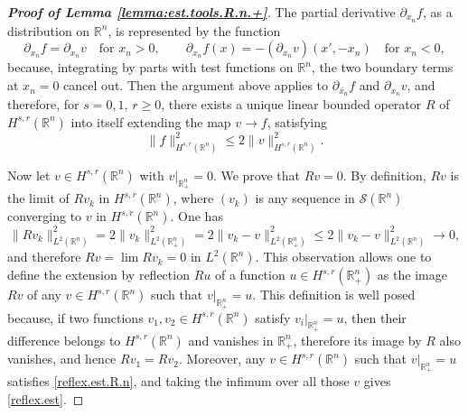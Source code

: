 \documentclass[10pt,reqno,a4paper]{article}
\numberwithin{equation}{section}
\theoremstyle{plain}
\theoremstyle{definition}
\newcommand{\R}{{\mathbb R}}
\newcommand{\mS}{\mathcal{S}}
\newcommand{\pa}{\partial}
\begin{document}
\begin{proof}[\textbf{Proof of Lemma \ref{lemma:est.tools.R.n.+}}]
The partial derivative $\pa_{x_n} f$, as a distribution on $\R^n$, is represented by the function
\[
\pa_{x_n} f = \pa_{x_n} v \quad \text{for } x_n > 0, 
\qquad 
\pa_{x_n} f(x) = - (\pa_{x_n} v)(x',-x_n) \quad \text{for } x_n < 0,
\] 
because, integrating by parts with test functions on $\R^n$, 
the two boundary terms at $x_n = 0$ cancel out. 
Then the argument above applies to $\pa_{x_n} f$ and $\pa_{x_n} v$, 
and therefore, for $s = 0,1$, $r \geq 0$, there exists a unique linear bounded operator $R$ 
of $H^{s,r}(\R^n)$ into itself extending the map $v \to f$, satisfying 
\begin{equation} \label{reflex.est.R.n} 
\| f \|_{H^{s,r}(\R^n)}^2 \leq 2 \| v \|_{H^{s,r}(\R^n)}^2. 
\end{equation} 

Now let $v \in H^{s,r}(\R^n)$ with $v|_{\R^n_+} = 0$. We prove that $Rv = 0$. 
By definition, $Rv$ is the limit of $R v_k$ in $H^{s,r}(\R^n)$,    
where $(v_k)$ is any sequence in $\mS(\R^n)$ converging to $v$ in $H^{s,r}(\R^n)$. 
One has
\[
\| Rv_k \|_{L^2(\R^n)}^2 = 2 \| v_k \|_{L^2(\R^n_+)}^2 
= 2 \| v_k - v \|_{L^2(\R^n_+)}^2 
\leq 2 \| v_k - v \|_{L^2(\R^n)}^2 \to 0,
\]
and therefore $Rv = \lim Rv_k = 0$ in $L^2(\R^n)$.  
This observation allows one to define the extension by reflection $R u$ 
of a function $u \in H^{s,r}(\R^n_+)$ 
as the image $R v$ of any $v \in H^{s,r}(\R^n)$ such that $v|_{\R^n_+} = u$. 
This definition is well posed because, if two functions $v_1, v_2 \in H^{s,r}(\R^n)$ 
satisfy $v_i|_{\R^n_+} = u$, then their difference belongs to $H^{s,r}(\R^n)$ 
and vanishes in $\R^n_+$, therefore its image by $R$ also vanishes, 
and hence $R v_1 = R v_2$. 
Moreover, any $v \in H^{s,r}(\R^n)$ such that $v|_{\R^n_+} = u$ satisfies \eqref{reflex.est.R.n}, 
and taking the infimum over all those $v$ gives \eqref{reflex.est}.

\medskip


\end{proof}
\end{document}

